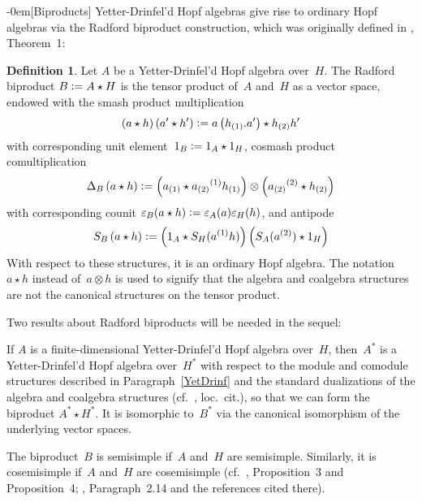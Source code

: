 \documentclass{article}
\makeatletter
\renewcommand{\subsection}{\@startsection{subsection}{2}{0em}%
{\baselineskip}{-0em}{\bfseries\normalsize}}
\newcounter{num}
\newenvironment{parlist}{\begin{list}{(\arabic{num})}{\usecounter{num} \leftmargin0pt \itemindent5pt \topsep0pt \labelwidth0pt}}{\end{list}}
\newcounter{num1}
\numberwithin{equation}{section}
\theoremstyle{definition}
\newtheorem*{defn}{Definition}
\theoremstyle{break}
\newcommand{\ot}{\mathbin{\otimes}}
\newcommand{\deq}{\vcentcolon =}
\newcommand{\sbb}{S_{B}}
\newcommand{\1}{{(1)}}
\newcommand{\2}{{(2)}}
\newcommand{\3}{{(3)}}
\newcommand{\db}{\Delta_{B}}
\newcommand{\ea}{{\varepsilon_{A}}}
\newcommand{\eb}{{\varepsilon_{B}}}
\newcommand{\eh}{{\varepsilon_{H}}}
\newcommand{\sa}{S_{A}}
\newcommand{\sh}{S_{H}}
\newcommand{\A}{1_A}
\newcommand{\HH}{1_H}
\makeatother
\begin{document}
\subsection[Biproducts]{}  \label{Biprod}
Yetter-Drinfel'd Hopf algebras give rise to ordinary Hopf algebras via the Radford biproduct construction, which was originally defined in \cite{RadfProj}, Theorem~1:
\begin{defn}
Let $A$ be a Yetter-Drinfel'd Hopf algebra over~$H$. The Radford biproduct
$B \deq A\star H$ is the tensor product of~$A$ and~$H$ as a vector space, endowed with the smash product multiplication
\begin{eqnarray} \label{Multip}
\left( a \star h\right) \left( a' \star  h' \right) \deq
a \left( h_{\1}.a'\right) \star h_{\2} h'
\end{eqnarray}
with corresponding unit element~$1_{B} \deq 1_{A} \star 1_{H}$, cosmash product comultiplication
\begin{eqnarray} \label{Comult}
\db \left( a \star h \right) \deq
\left( a_{\1} \star a_{\2}{}^\1 h_{\1} \right) \ot \left(a_{\2}{}^\2 \star h_{\2} \right)
\end{eqnarray}
with corresponding counit
$\eb (a \star h) \deq \ea (a) \eh(h)$, and antipode
\begin{eqnarray} \label{Antip}
\sbb \left( a \star h \right) \deq
\left( \A \star \sh(a^{\1} h)
\right) \left( \sa (a^{\2}) \star \HH \right)
\end{eqnarray}
With respect to these structures, it is an ordinary Hopf algebra. The notation~\mbox{$a \star h$} instead of~$a \ot h$ is used to signify that the algebra and coalgebra structures are not the canonical structures on the tensor product.
\end{defn}

Two results about Radford biproducts will be needed in the sequel:
\begin{parlist}
\item
If $A$ is a finite-dimensional Yetter-Drinfel'd Hopf algebra over~$H$, then~$A^*$ is a Yetter-Drinfel'd Hopf algebra over~$H^*$ with respect to the module and comodule structures described in Paragraph~\ref{YetDrinf} and the standard dualizations of the algebra and coalgebra structures (cf.~\cite{SoYp}, loc.~cit.), so that we can form the biproduct $A^* \star H^*$. It is isomorphic to~$B^*$ via the canonical isomorphism of the underlying vector spaces.

\item
The biproduct~$B$ is semisimple if~$A$ and~$H$ are semisimple. Similarly, it is cosemisimple if~$A$ and~$H$ are cosemisimple (cf.~\cite{RadfProj}, Proposition~3 and Proposition~4; \cite{SoRib}, Paragraph~2.14 and the references cited there).
\end{parlist}
\end{document}
